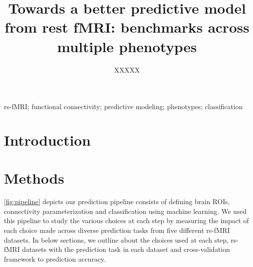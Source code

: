 \documentclass[5p]{elsarticle}
\begin{document}

\title{Towards a better predictive model from rest fMRI: benchmarks across
multiple phenotypes}


\author[parietal,cea]{XXXXX}


\address[parietal]{Parietal project-team, INRIA Saclay-\^ile de France,
France}
\address[cea]{CEA/Neurospin b\^at 145, 91191 Gif-Sur-Yvette, France}


\begin{abstract}
%
%
\end{abstract}

\begin{keyword}
    rs-fMRI; functional connectivity; predictive modeling; phenotypes;
    classification
\end{keyword}

\maketitle%

\vspace*{-3em}%

\sloppy %

\section{Introduction}%


\section{Methods}

\autoref{fig:pipeline}  depicts  our  prediction  pipeline consists of
defining brain ROIs, connectivity parameterization and classification using
machine learning. We used this pipeline to study the various choices
at each
step by measuring the impact of each choice made across diverse prediction
tasks from five different rs-fMRI datasets. In below sections, we outline
about the choices used at each step, rs-fMRI datasets with the prediction task
in each dataset and cross-validation framework to prediction accuracy.
\end{document}
